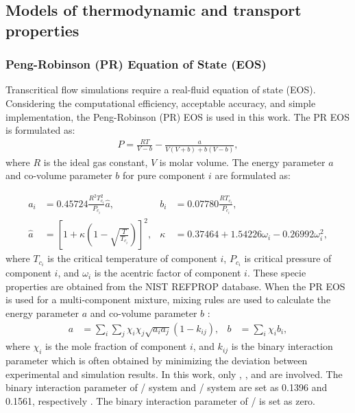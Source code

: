 \subsection{Models of thermodynamic and transport properties} \label{thermo models}
\subsubsection{Peng-Robinson (PR) Equation of State (EOS)}
Transcritical flow simulations require a real-fluid equation of state (EOS). Considering the computational efficiency, acceptable accuracy, and simple implementation, the Peng-Robinson (PR) EOS \cite{peng1976new} is used in this work. The PR EOS is formulated as:
\begin{align}
    P=\frac{RT}{V-b}-\frac{a}{V\left(V+b\right)+b\left(V-b\right)}, %
    \label{eq:preos}
\end{align}
where $R$ is the ideal gas constant, $V$ is molar volume. The energy parameter $a$ and co-volume parameter $b$ for pure component $i$ are formulated as:

\begin{align}
    a_i &= 0.45724\frac{R^2 T_{c_i}^2}{P_{c_i}} \hat{a} , &b_i&=0.07780\frac{RT_{c_i}}{P_{c_i}} \label{eq:ab},\\
    \hat{a}&=\left[1+\kappa\left(1-\sqrt{\frac{T}{T_{c_i}}}\right)\right]^2, &\kappa&=0.37464+1.54226\omega_i-0.26992\omega_i^2,
\end{align}
where $T_{c_i}$ is the critical temperature of component $i$, $P_{c_i}$ is critical pressure of component $i$, and $\omega_i$ is the acentric factor of component $i$. These specie properties are obtained from the NIST REFPROP database. When the PR EOS is used for a multi-component mixture, mixing rules are used to calculate the energy parameter $a$ and co-volume parameter $b$ \cite{reid1977properties}:
\begin{align}
a&=\sum_i\sum_j\chi_i\chi_j\sqrt{a_ia_j}(1-k_{ij}),& b&=\sum_i\chi_i b_i,\label{eq:mix}
\end{align}
where $\chi_i$ is the mole fraction of component $i$, and $k_{ij}$ is the binary interaction parameter which is often obtained by minimizing the deviation between experimental and simulation results. In this work, only , , and  are involved. The binary interaction parameter of / system and / system are set as 0.1396 and 0.1561, respectively \cite{eliosa2009vapor,garcia2011vapor}. The binary interaction parameter of / is set as zero.


